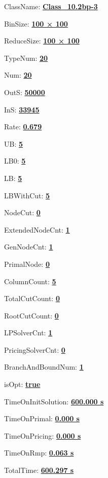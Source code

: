 \documentclass[11pt]{article}
\begin{document}
\pagestyle{empty}


ClassName: \underline{\textbf{Class_10.2bp-3}}
\par
BinSize: \underline{\textbf{100 × 100}}
\par
ReduceSize: \underline{\textbf{100 × 100}}
\par
TypeNum: \underline{\textbf{20}}
\par
Num: \underline{\textbf{20}}
\par
OutS: \underline{\textbf{50000}}
\par
InS: \underline{\textbf{33945}}
\par
Rate: \underline{\textbf{0.679}}
\par
UB: \underline{\textbf{5}}
\par
LB0: \underline{\textbf{5}}
\par
LB: \underline{\textbf{5}}
\par
LBWithCut: \underline{\textbf{5}}
\par
NodeCut: \underline{\textbf{0}}
\par
ExtendedNodeCnt: \underline{\textbf{1}}
\par
GenNodeCnt: \underline{\textbf{1}}
\par
PrimalNode: \underline{\textbf{0}}
\par
ColumnCount: \underline{\textbf{5}}
\par
TotalCutCount: \underline{\textbf{0}}
\par
RootCutCount: \underline{\textbf{0}}
\par
LPSolverCnt: \underline{\textbf{1}}
\par
PricingSolverCnt: \underline{\textbf{0}}
\par
BranchAndBoundNum: \underline{\textbf{1}}
\par
isOpt: \underline{\textbf{true}}
\par
TimeOnInitSolution: \underline{\textbf{600.000 s}}
\par
TimeOnPrimal: \underline{\textbf{0.000 s}}
\par
TimeOnPricing: \underline{\textbf{0.000 s}}
\par
TimeOnRmp: \underline{\textbf{0.063 s}}
\par
TotalTime: \underline{\textbf{600.297 s}}
\par
\newpage
\end{document}

